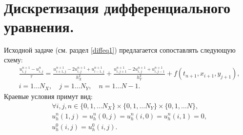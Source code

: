 \documentclass[14pt,a4paper]{extarticle}
\newcommand{\1}{\mathbbm{1}}
\begin{document}
\section{Дискретизация дифференциального уравнения.} \label{scheme1}
Исходной задаче (см. раздел \ref{diffeq1}) предлагается сопоставлять следующую схему:
\begin{align*}
    &\frac{u_{i, j}^{n+1} - u_{i, j}^n}{\tau} = \frac{u_{i+1, j}^{n+1} - 2 u_{i, j}^{n+1} + u_{i-1, j}^{n+1}}{h_X^2} + 
    \frac{u_{i, j+1}^{n+1} - 2 u_{i, j}^{n+1} 
    + u_{i, j-1}^{n+1}}{h_Y^2} + f(t_{n+1}, x_{i+1}, y_{j+1}), \\
    & i = 1 \ldots N_X, \quad j = 1 \ldots N_Y, \quad n = 1 \ldots N-1.
\end{align*}
Краевые условия примут вид:
\begin{align*} 
    &\forall i, j, n \in \{0, 1, \ldots N_X\}\times\{0, 1, \ldots N_Y\}\times\{0, 1, \ldots N\} ,\\
    &u^n_h(1, j) = u^n_h(0, j) = u^n_h{(i, 0)} = u^n_h{(i, 1)} = 0, \\
    &u^0_h{(i, j)} = u^0_h(i, j). 
\end{align*}
\end{document}
